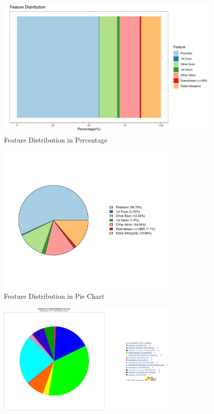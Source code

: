\documentclass[UTF8]{ctexart}
\begin{document}
\begin{figure}
	\centering
	\includegraphics[width=\textwidth]{img/peaks_feature_distribution.pdf}
    \caption{Feature Distribution in Percentage}
\end{figure}

\begin{figure}
	\centering
	\includegraphics[width=0.8\textwidth]{img/peaks_pie.pdf}
    \caption{Feature Distribution in Pie Chart}
\end{figure}



\begin{figure}[htb]
	\centering
	\includegraphics[width=0.8\textwidth]{img/GO_BioPro.png}
\end{figure}
\end{document}
